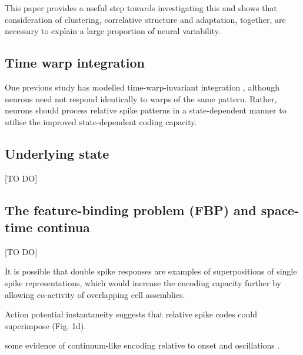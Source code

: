 \documentclass{article}
\begin{document}
This paper provides a useful step towards investigating this and shows that consideration of clustering, correlative structure and adaptation, together, are necessary to explain a large proportion of neural variability.

\subsection*{Time warp integration}

One previous study has modelled time-warp-invariant integration \cite{gutig2009time}, although neurons need not respond identically to warps of the same pattern. Rather, neurons should process relative spike patterns in a state-dependent manner to utilise the improved state-dependent coding capacity.



\subsection*{Underlying state}
[TO DO]


\subsection*{The feature-binding problem (FBP) and space-time continua}
[TO DO]

It is possible that double spike responses are examples of superpositions of single spike representations, which would increase the encoding capacity further by allowing co-activity of overlapping cell assemblies. 

Action potential instantaneity suggests that relative spike codes could superimpose (Fig. 1d).

some evidence of continuum-like encoding relative to onset \cite{gollisch2008rapid, storchi2012comparison} and oscillations \cite{havenith2011synchrony}.
\end{document}
